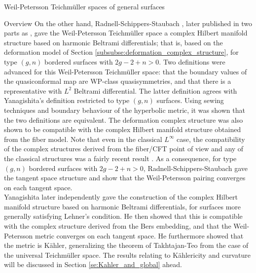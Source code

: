\documentclass[12pt]{amsart}
\theoremstyle{plain}
\theoremstyle{definition}
\theoremstyle{remark}
\numberwithin{equation}{section} %
\numberwithin{figure}{section} %
\begin{document}
\begin{section}{Weil-Petersson Teichm\"uller spaces of general surfaces}
\begin{subsection}{Overview}
On the other hand, Radnell-Schippers-Staubach \cite{RSS_WP_arxiv}, later published in two parts as \cite{RSS_WP1,RSS_WP2}, gave the Weil-Petersson Teichm\"uller space a complex Hilbert manifold structure based on harmonic Beltrami differentials; that is, based on the deformation model of Section \ref{subsubse:deformation_complex_structure}, for type $(g,n)$ bordered surfaces with $2g-2+n>0$. Two definitions were advanced for this Weil-Petersson Teichm\"uller space: that the boundary values of the quasiconformal map are WP-class quasisymmetries, and that there is a representative with $L^2$ Beltrami differential. The latter definition agrees with Yanagishita's definition restricted to type $(g,n)$ surfaces.  Using sewing techniques and boundary behaviour of the hyperbolic metric, it was shown that the two definitions are equivalent. The deformation complex structure was also shown to be compatible with the complex Hilbert manifold structure obtained from the fiber model. Note that even in the classical $L^\infty$ case, the compatibility of the complex structures derived from the fiber/CFT point of view and any of the classical structures was a fairly recent result \cite{RadnellSchippers_fiber}. 
As a consequence, for type $(g,n)$ bordered surfaces with $2g-2+n>0$,  Radnell-Schippers-Staubach \cite{RSS_WP_arxiv} gave the tangent space structure and show that the Weil-Petersson pairing converges on each tangent space.\\  

Yanagishita \cite{Yanagishita_Kahler} later independently gave the construction of the complex Hilbert manifold structure based on harmonic Beltrami differentials, for surfaces more generally satisfying Lehner's condition. He then showed that this is compatible with the complex structure derived from the Bers embedding, and that the Weil-Petersson metric converges on each tangent space. He furthermore showed that the metric is K\"ahler, generalizing the theorem of Takhtajan-Teo from the case of the universal Teichm\"uller space.  The results relating to K\"ahlericity and curvature will be discussed in Section \ref{se:Kahler_and_global} ahead.\\ 


\end{subsection}
\end{section}
\end{document}
